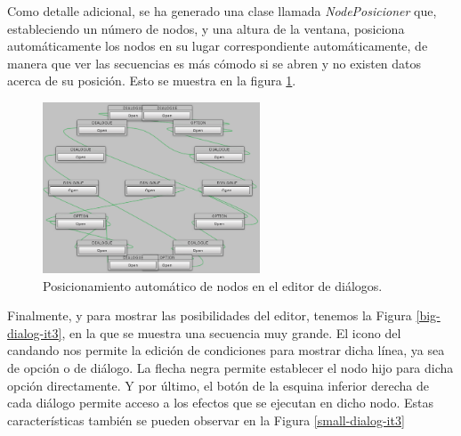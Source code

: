 Como detalle adicional, se ha generado una clase llamada \textit{NodePosicioner} que, estableciendo un número de nodos, y una altura de la ventana, posiciona automáticamente los nodos en su lugar correspondiente automáticamente, de manera que ver las secuencias es más cómodo si se abren y no existen datos acerca de su posición. Esto se muestra en la figura \ref{circle-nodes-it3}.

\begin{figure}[h!]
	\centerline{\includegraphics[height=2in]{figures/it3/nodes-circle.png}}
	\caption[Anillo de nodos - Editor de Diálogos]{Posicionamiento automático de nodos en el editor de diálogos.}
	\label{circle-nodes-it3}
\end{figure}

Finalmente, y para mostrar las posibilidades del editor, tenemos la Figura \ref{big-dialog-it3}, en la que se muestra una secuencia muy grande. El icono del candando nos permite la edición de condiciones para mostrar dicha línea, ya sea de opción o de diálogo. La flecha negra permite establecer el nodo hijo para dicha opción directamente. Y por último, el botón de la esquina inferior derecha de cada diálogo permite acceso a los efectos que se ejecutan en dicho nodo. Estas características también se pueden observar en la Figura \ref{small-dialog-it3}


